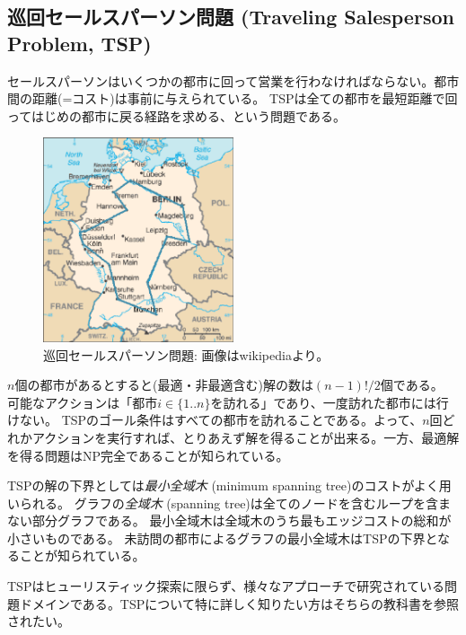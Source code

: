 
\subsection{巡回セールスパーソン問題 (Traveling Salesperson Problem, TSP)}

セールスパーソンはいくつかの都市に回って営業を行わなければならない。都市間の距離(=コスト)は事前に与えられている。
TSPは全ての都市を最短距離で回ってはじめの都市に戻る経路を求める、という問題である\cite{applegate2006traveling}。

\begin{figure}
\centering
\includegraphics[bb=0 0 328 352,width=0.5\textwidth]{figures/tsp.eps}%
\caption{巡回セールスパーソン問題: 画像はwikipediaより。}
\label{fig:sokoban}
\end{figure}

$n$個の都市があるとすると(最適・非最適含む)解の数は$(n-1)!/2$個である。
可能なアクションは「都市$i \in \{1..n\}$を訪れる」であり、一度訪れた都市には行けない。
TSPのゴール条件はすべての都市を訪れることである。よって、$n$回どれかアクションを実行すれば、とりあえず解を得ることが出来る。一方、最適解を得る問題はNP完全であることが知られている。

TSPの解の下界としては{\it 最小全域木} (minimum spanning tree)のコストがよく用いられる\cite{kruskal1956shortest,held1970traveling}。
グラフの{\it 全域木} (spanning tree)は全てのノードを含むループを含まない部分グラフである。
最小全域木は全域木のうち最もエッジコストの総和が小さいものである。
未訪問の都市によるグラフの最小全域木はTSPの下界となることが知られている。

TSPはヒューリスティック探索に限らず、様々なアプローチで研究されている問題ドメインである\cite{applegate2006traveling}。TSPについて特に詳しく知りたい方はそちらの教科書を参照されたい。


